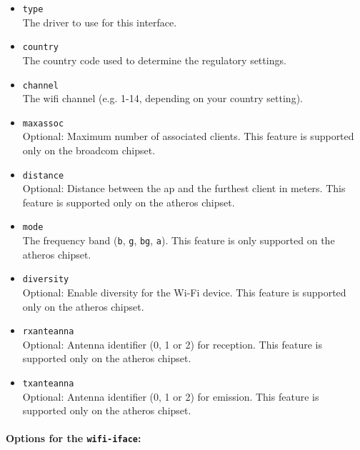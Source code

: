 \begin{itemize}
    \item \texttt{type} \\
        The driver to use for this interface.
	
    \item \texttt{country} \\
        The country code used to determine the regulatory settings.

    \item \texttt{channel} \\
        The wifi channel (e.g. 1-14, depending on your country setting).

    \item \texttt{maxassoc} \\
        Optional: Maximum number of associated clients. This feature is supported only on the broadcom chipset.

    \item \texttt{distance} \\
	Optional: Distance between the ap and the furthest client in meters. This feature is supported only on the atheros chipset.

	\item \texttt{mode} \\
		The frequency band (\texttt{b}, \texttt{g}, \texttt{bg}, \texttt{a}). This feature is only supported on the atheros chipset.

    \item \texttt{diversity} \\
	Optional: Enable diversity for the Wi-Fi device. This feature is supported only on the atheros chipset.

    \item \texttt{rxanteanna} \\
	Optional: Antenna identifier (0, 1 or 2) for reception. This feature is supported only on the atheros chipset.

    \item \texttt{txanteanna} \\
	Optional: Antenna identifier (0, 1 or 2) for emission. This feature is supported only on the atheros chipset.

\end{itemize}

\paragraph{Options for the \texttt{wifi-iface}:}

